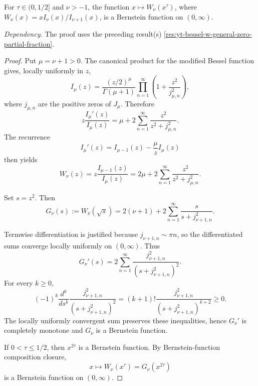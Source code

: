 \begin{proposition}
\label{res:yang-tian-bessel-w-bernstein-conjecture}
For \(\tau\in(0,1/2]\) and \(\nu>-1\), the function \(x\mapsto W_\nu(x^\tau)\), where \(W_\nu(x)=xI_\nu(x)/I_{\nu+1}(x)\), is a Bernstein function on \((0,\infty)\).

\emph{Dependency.} The proof uses the preceding result(s) \ref{res:yt-bessel-w-general-zero-partial-fraction}.
\end{proposition}
\begin{proof}
Put \(\mu=\nu+1>0\). The canonical product for the modified Bessel function gives, locally uniformly in \(z\),
\[
I_\mu(z)=\frac{(z/2)^\mu}{\Gamma(\mu+1)}
\prod_{n=1}^{\infty}\left(1+\frac{z^2}{j_{\mu,n}^2}\right),
\]
where \(j_{\mu,n}\) are the positive zeros of \(J_\mu\). Therefore
\[
z\frac{I_\mu'(z)}{I_\mu(z)}
=\mu+2\sum_{n=1}^{\infty}\frac{z^2}{z^2+j_{\mu,n}^2}.
\]
The recurrence
\[
I_\mu'(z)=I_{\mu-1}(z)-\frac{\mu}{z}I_\mu(z)
\]
then yields
\[
W_\nu(z)
=z\frac{I_{\mu-1}(z)}{I_\mu(z)}
=2\mu+2\sum_{n=1}^{\infty}\frac{z^2}{z^2+j_{\mu,n}^2}.
\]

Set \(s=z^2\). Then
\[
G_\nu(s):=W_\nu(\sqrt s)
=2(\nu+1)+2\sum_{n=1}^{\infty}\frac{s}{s+j_{\nu+1,n}^2}.
\]

Termwise differentiation is justified because \(j_{\nu+1,n}\sim \pi n\), so the differentiated sums converge locally uniformly on \((0,\infty)\). Thus
\[
G_\nu'(s)
=2\sum_{n=1}^{\infty}
\frac{j_{\nu+1,n}^2}{(s+j_{\nu+1,n}^2)^2}.
\]
For every \(k\ge0\),
\[
(-1)^k\frac{d^k}{ds^k}
\frac{j_{\nu+1,n}^2}{(s+j_{\nu+1,n}^2)^2}
=
(k+1)!\frac{j_{\nu+1,n}^2}{(s+j_{\nu+1,n}^2)^{k+2}}
\ge0.
\]
The locally uniformly convergent sum preserves these inequalities, hence \(G_\nu'\) is completely monotone and \(G_\nu\) is a Bernstein function.

If \(0<\tau\le1/2\), then \(x^{2\tau}\) is a Bernstein function. By Bernstein-function composition closure,
\[
x\mapsto W_\nu(x^\tau)=G_\nu(x^{2\tau})
\]
is a Bernstein function on \((0,\infty)\).
\end{proof}

